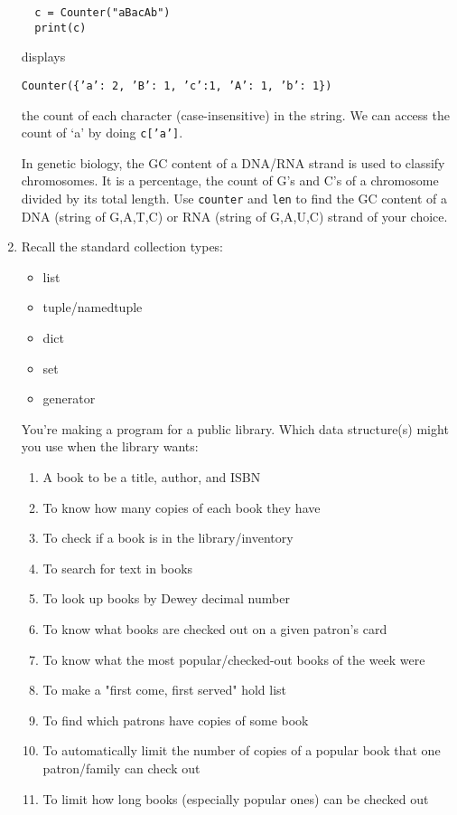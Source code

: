 \documentclass{article}
\begin{document}
\begin{enumerate}
\begin{verbatim}
  c = Counter("aBacAb")
  print(c)
  \end{verbatim}
  displays 
  
  \begin{center}
    \texttt{Counter(\{'a': 2, 'B': 1, 'c':1, 'A': 1, 'b': 1\})}
  \end{center}
  
  the count of each character (case-insensitive) in the string. We can
  access the count of `a' by doing \texttt{c['a']}.

  In genetic biology, the GC content of a DNA/RNA strand is used to classify
  chromosomes. It is a percentage, the count of G's and C's of a chromosome
  divided by its total length. Use \texttt{counter} and \texttt{len} to find
  the GC content of a DNA (string of G,A,T,C) or RNA (string of G,A,U,C) strand
  of your choice.

  \item Recall the standard collection types:
  \begin{itemize}
    \item list
    \item tuple/namedtuple
    \item dict
    \item set
    \item generator
  \end{itemize}
  You're making a program for a public library.
  Which data structure(s) might you use when the library wants:

  \begin{enumerate}
    \item A book to be a title, author, and ISBN
    \item To know how many copies of each book they have
    \item To check if a book is in the library/inventory
    \item To search for text in books
    \item To look up books by Dewey decimal number
    \item To know what books are checked out on a given patron's card
    \item To know what the most popular/checked-out books of the week were
    \item To make a "first come, first served" hold list 
    \item To find which patrons have copies of some book
    \item To automatically limit the number of copies of a popular book 
          that one patron/family can check out
    \item To limit how long books (especially popular ones) can be checked out
  \end{enumerate}


\end{enumerate}
\end{document}
